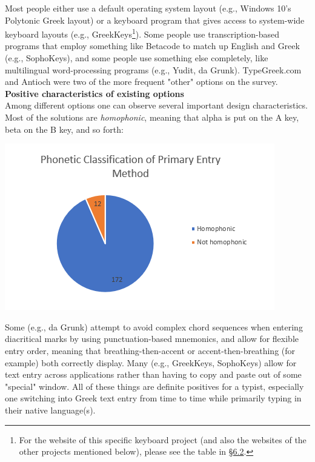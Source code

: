 \documentclass[11pt]{article}
\begin{document}
Most people either use a default operating system layout (e.g., Windows 10's Polytonic Greek layout) or a keyboard program that gives access to system-wide keyboard layouts (e.g., GreekKeys\footnote{For the website of this specific keyboard project (and also the websites of the other projects mentioned below), please see the table in \hyperref[sec:orga7293a5]{§6.2}.}). Some people use transcription-based programs that employ something like Betacode to match up English and Greek (e.g., SophoKeys), and some people use something else completely, like multilingual word-processing programs (e.g., Yudit, da Grunk). TypeGreek.com and Antioch were two of the more frequent "other" options on the survey. \\

\noindent \textbf{Positive characteristics of existing options} \\

Among different options one can observe several important design characteristics. Most of the solutions are \emph{homophonic}, meaning that alpha is put on the A key, beta on the B key, and so forth:

\begin{center}
\includegraphics[width=.9\linewidth]{./images/homophonic.PNG}
\end{center}

Some (e.g., da Grunk) attempt to avoid complex chord sequences when entering diacritical marks by using punctuation-based mnemonics, and allow for flexible entry order, meaning that breathing-then-accent or accent-then-breathing (for example) both correctly display. Many (e.g., GreekKeys, SophoKeys) allow for text entry across applications rather than having to copy and paste out of some "special" window. All of these things are definite positives for a typist, especially one switching into Greek text entry from time to time while primarily typing in their native language(s). \\
\end{document}
